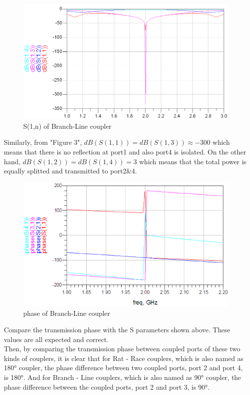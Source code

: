 \documentclass[11pt,a4paper]{report}
\begin{document}
\begin{figure}
\centering
\includegraphics[width=\textwidth]{2.5.png}
\caption{S(1,n) of Branch-Line coupler}
\end{figure}

Similarly, from "Figure 3", \(dB(S(1,1)) = dB(S(1,3)) \approx -300\) which means that there is no reflection at port1 and also port4 is isolated. On the other hand, \(dB(S(1,2)) = dB(S(1,4)) = 3\) which means that the total power is equally splitted and transmitted to port2\&4. \\

\begin{figure}
\centering
\includegraphics[width=\textwidth]{branch-line-phase.eps}
\caption{phase of Branch-Line coupler}
\end{figure}

Compare the transmission phase with the S parameters shown above. These values are all expected and correct. \\

Then, by comparing the transmission phase between coupled ports of these two kinds of couplers, it is clear that for Rat - Race couplers, which is also named as  180° coupler, the phase difference between two coupled ports, port 2 and port 4, is 180°. And for Branch - Line couplers, which is also named as  90° coupler, the phase difference between the coupled ports, port 2 and port 3, is 90°. \\
\end{document}
